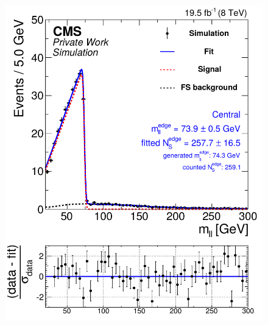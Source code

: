 \begin{figure}[t]
  \centering
  \begin{minipage}[t]{0.49\textwidth}
    \includegraphics[width=\textwidth]{plots/results/fit/mcFits/shapeIllustrationKTriangle_SignalInclusive_Combined_Full2012_KTriangle_MC_slepton_500_175_100_Central.pdf}
  \end{minipage}
  \begin{minipage}[t]{0.49\textwidth}

\end{minipage}
\end{figure}
